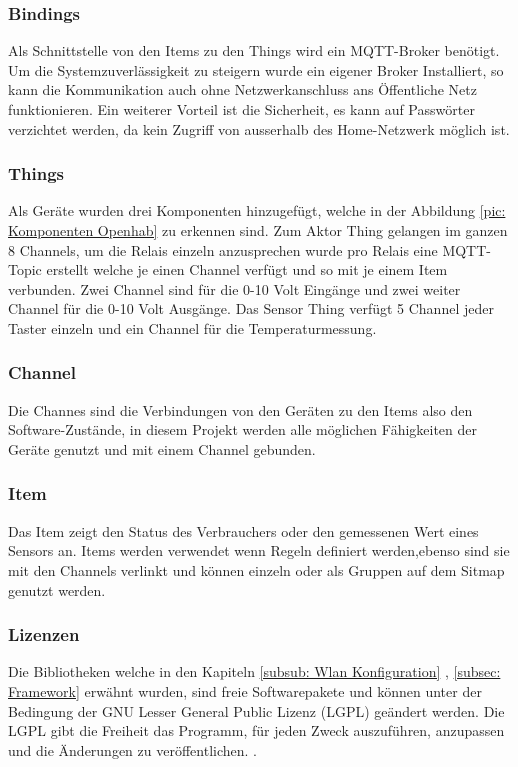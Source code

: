 \subsubsection{Bindings}
Als Schnittstelle von den Items zu den Things wird ein MQTT-Broker benötigt. Um die Systemzuverlässigkeit zu steigern wurde ein eigener Broker Installiert, so kann die Kommunikation auch ohne Netzwerkanschluss ans Öffentliche Netz funktionieren. Ein weiterer Vorteil ist die Sicherheit, es kann auf Passwörter verzichtet werden, da kein Zugriff von ausserhalb des Home-Netzwerk möglich ist.

\subsubsection{Things}
 Als Geräte wurden drei Komponenten hinzugefügt, welche in der Abbildung \ref{pic: Komponenten Openhab} zu erkennen sind. Zum Aktor Thing gelangen im ganzen 8 Channels, um die Relais einzeln anzusprechen wurde pro Relais eine MQTT-Topic erstellt welche je einen Channel verfügt und so mit je einem Item verbunden. Zwei Channel sind für die 0-10 Volt Eingänge und zwei weiter Channel für die 0-10 Volt Ausgänge. Das Sensor Thing verfügt 5 Channel jeder Taster einzeln und ein Channel für die Temperaturmessung.

\subsubsection{Channel}
Die Channes sind die Verbindungen von den Geräten zu den Items also den Software-Zustände, in diesem Projekt werden alle möglichen Fähigkeiten der Geräte genutzt und mit einem Channel gebunden.

\subsubsection{Item}
Das Item zeigt den Status des Verbrauchers oder den gemessenen Wert eines Sensors an. Items werden verwendet wenn Regeln definiert werden,ebenso sind sie mit den Channels verlinkt und können einzeln oder als Gruppen auf dem Sitmap genutzt werden.


 
   
\subsubsection{Lizenzen} 
Die Bibliotheken welche in den Kapiteln \ref{subsub: Wlan Konfiguration} , \ref{subsec: Framework} erwähnt wurden, sind freie Softwarepakete und können unter der Bedingung der GNU Lesser General Public Lizenz (LGPL) geändert werden. Die LGPL gibt die Freiheit das Programm, für jeden Zweck auszuführen, anzupassen und die Änderungen zu veröffentlichen. \cite{noauthor_gnu.org_nodate}.


 
